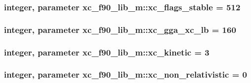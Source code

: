 \hypertarget{classxc__f90__lib__m_a4a87ea91849583b82deb63b42c4f8c3e}{
\subsubsection[{xc\-\_\-flags\-\_\-stable}]{\setlength{\rightskip}{0pt plus 5cm}integer, parameter xc\-\_\-f90\-\_\-lib\-\_\-m\-::xc\-\_\-flags\-\_\-stable = 512}}\label{classxc__f90__lib__m_a4a87ea91849583b82deb63b42c4f8c3e}
\hypertarget{classxc__f90__lib__m_a32cd4bce8e7a15f244e9186054154fc7}{
\subsubsection[{xc\-\_\-gga\-\_\-xc\-\_\-lb}]{\setlength{\rightskip}{0pt plus 5cm}integer, parameter xc\-\_\-f90\-\_\-lib\-\_\-m\-::xc\-\_\-gga\-\_\-xc\-\_\-lb = 160}}\label{classxc__f90__lib__m_a32cd4bce8e7a15f244e9186054154fc7}
\hypertarget{classxc__f90__lib__m_a583eff4a497d696e6234a409b548c9fa}{
\subsubsection[{xc\-\_\-kinetic}]{\setlength{\rightskip}{0pt plus 5cm}integer, parameter xc\-\_\-f90\-\_\-lib\-\_\-m\-::xc\-\_\-kinetic = 3}}\label{classxc__f90__lib__m_a583eff4a497d696e6234a409b548c9fa}
\hypertarget{classxc__f90__lib__m_a5e7e9fc87cf15161b57eb9b9f1f50190}{
\subsubsection[{xc\-\_\-non\-\_\-relativistic}]{\setlength{\rightskip}{0pt plus 5cm}integer, parameter xc\-\_\-f90\-\_\-lib\-\_\-m\-::xc\-\_\-non\-\_\-relativistic = 0}}\label{classxc__f90__lib__m_a5e7e9fc87cf15161b57eb9b9f1f50190}
